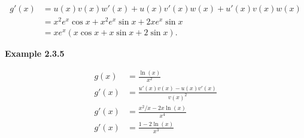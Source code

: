\begin{align*}
    g'(x) &= u(x)v(x)w'(x) + u(x)v'(x)w(x) + u'(x)v(x)w(x) \\
    &= x^2 e^x \cos x + x^2 e^x \sin x + 2x e^x \sin x \\
    &= xe^x(x \cos x + x \sin x + 2\sin x).
\end{align*}

\vspace{10mm}
\textbf{Example 2.3.5}

\begin{align*}
    g(x) &= \frac{\ln(x)}{x^2}\\
    g'(x) &=\frac{u'(x)v(x)-u(x)v'(x)}{v(x)^2}\\
    g'(x) &= \frac{x^2/x-2x\ln(x)}{x^4}\\
    g'(x) &= \frac{1-2\ln(x)}{x^3}
\end{align*}